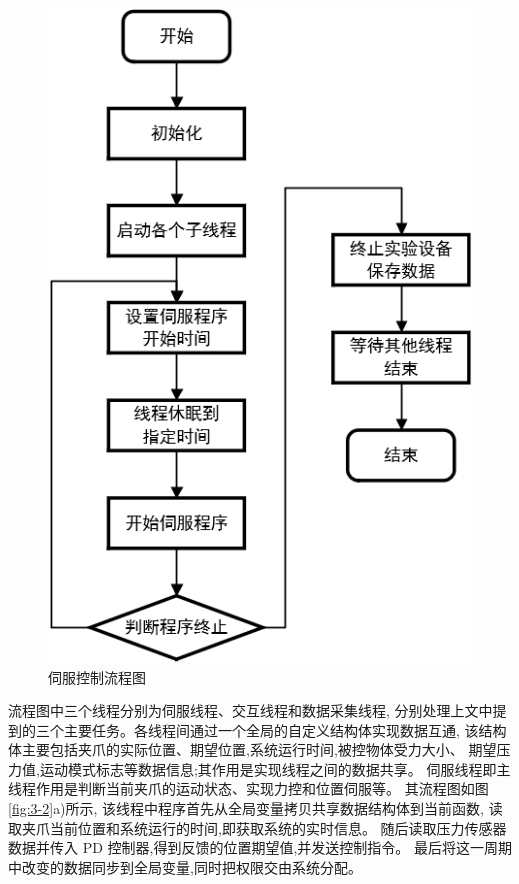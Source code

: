 \begin{figure}[!ht]
  \centering
  \includegraphics[scale=0.41]{chapter03/pic/3-1}
  \caption{伺服控制流程图\label{fig:3-1}}
  \vspace{-0.3cm}
\end{figure}

流程图中三个线程分别为伺服线程、交互线程和数据采集线程,
分别处理上文中提到的三个主要任务。各线程间通过一个全局的自定义结构体实现数据互通,
该结构体主要包括夹爪的实际位置、期望位置,系统运行时间,被控物体受力大小、
期望压力值,运动模式标志等数据信息;其作用是实现线程之间的数据共享。
伺服线程即主线程作用是判断当前夹爪的运动状态、实现力控和位置伺服等。
其流程图如图\ref{fig:3-2}a)所示,
该线程中程序首先从全局变量拷贝共享数据结构体到当前函数,
读取夹爪当前位置和系统运行的时间,即获取系统的实时信息。
随后读取压力传感器数据并传入 PD 控制器,得到反馈的位置期望值,并发送控制指令。
最后将这一周期中改变的数据同步到全局变量,同时把权限交由系统分配。

